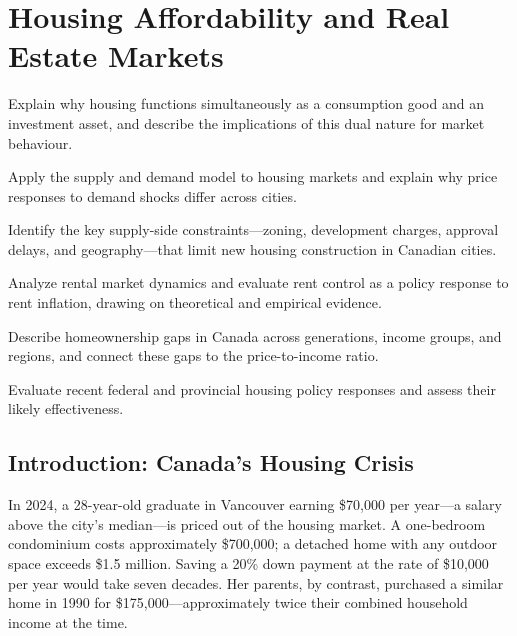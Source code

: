 
\chapter{Housing Affordability and Real Estate Markets}
\label{ch:housing}

\begin{learningobjectives}
\item Explain why housing functions simultaneously as a consumption good and an investment asset, and describe the implications of this dual nature for market behaviour.
\item Apply the supply and demand model to housing markets and explain why price responses to demand shocks differ across cities.
\item Identify the key supply-side constraints---zoning, development charges, approval delays, and geography---that limit new housing construction in Canadian cities.
\item Analyze rental market dynamics and evaluate rent control as a policy response to rent inflation, drawing on theoretical and empirical evidence.
\item Describe homeownership gaps in Canada across generations, income groups, and regions, and connect these gaps to the price-to-income ratio.
\item Evaluate recent federal and provincial housing policy responses and assess their likely effectiveness.
\end{learningobjectives}

\section{Introduction: Canada's Housing Crisis}

In 2024, a 28-year-old graduate in Vancouver earning \$70,000 per year---a salary above the city's median---is priced out of the housing market. A one-bedroom condominium costs approximately \$700,000; a detached home with any outdoor space exceeds \$1.5 million. Saving a 20\% down payment at the rate of \$10,000 per year would take seven decades. Her parents, by contrast, purchased a similar home in 1990 for \$175,000---approximately twice their combined household income at the time.

